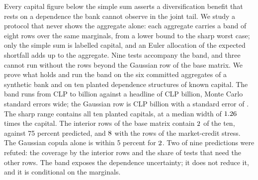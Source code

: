 Every capital figure below the simple sum asserts a diversification benefit that rests on a dependence the bank cannot
observe in the joint tail. We study a protocol that never shows
the aggregate alone: each aggregate carries a band of eight rows over the same marginals,
from a lower bound to the sharp worst case; only the simple sum is labelled capital, and an Euler allocation of the expected
shortfall adds up to the aggregate. Nine tests accompany the band, and three cannot run without the rows beyond the Gaussian row of the base matrix.
We prove what holds and run the band on the six committed aggregates of a
synthetic bank and on ten planted dependence structures of known capital. The band runs from CLP
\bdLower{} to \bdWorst{} billion against a headline of CLP \bdHeadline{} billion, \bdWidthOverSe{} Monte Carlo standard errors wide;
the Gaussian row is CLP \bdGauss{} billion with a standard error of \bdGaussSe{}. The sharp range contains all ten planted
capitals, at a median width of $1.26$ times the capital. The interior rows of the base matrix contain $2$ of
the ten, against 75 percent predicted, and $8$ with the rows of the market-credit stress. The Gaussian copula
alone is within 5 percent for $2$. Two of nine predictions were refuted: the coverage by the interior rows and the
share of tests that need the other rows. The band exposes the dependence uncertainty; it does not reduce it, and it is conditional on the marginals.
